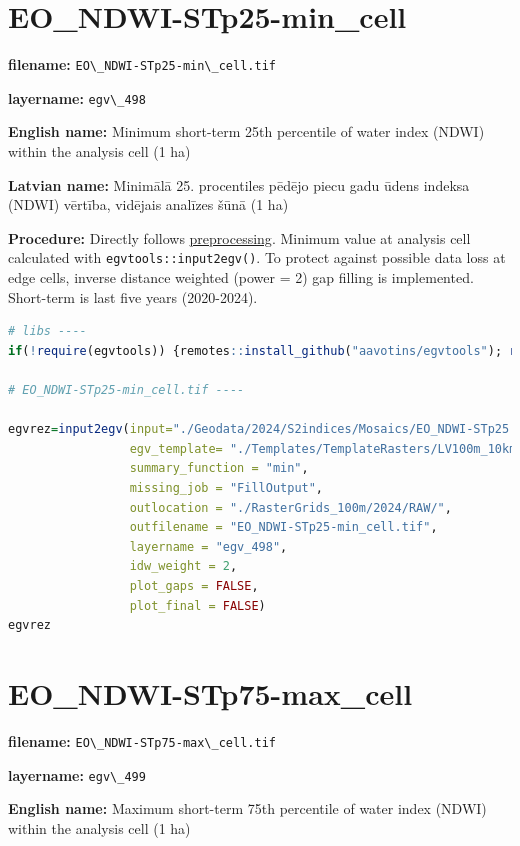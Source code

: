 \documentclass[
]{book}
\newcommand{\passthrough}[1]{#1}
\begin{document}
\section{EO\_NDWI-STp25-min\_cell}\label{ch06.498}

\textbf{filename:} \passthrough{\lstinline!EO\_NDWI-STp25-min\_cell.tif!}

\textbf{layername:} \passthrough{\lstinline!egv\_498!}

\textbf{English name:} Minimum short-term 25th percentile of water index (NDWI) within the analysis cell (1 ha)

\textbf{Latvian name:} Minimālā 25. procentiles pēdējo piecu gadu ūdens indeksa (NDWI) vērtība, vidējais analīzes šūnā (1 ha)

\textbf{Procedure:} Directly follows \hyperref[Ch04.13]{preprocessing}. Minimum value at analysis cell
calculated with \passthrough{\lstinline!egvtools::input2egv()!}. To protect against possible data loss at edge cells,
inverse distance weighted (power = 2) gap filling is implemented. Short-term is last five years (2020-2024).

\begin{lstlisting}[language=R]
# libs ----
if(!require(egvtools)) {remotes::install_github("aavotins/egvtools"); require(egvtools)}

# EO_NDWI-STp25-min_cell.tif ----

egvrez=input2egv(input="./Geodata/2024/S2indices/Mosaics/EO_NDWI-STp25.tif",
                 egv_template= "./Templates/TemplateRasters/LV100m_10km.tif",
                 summary_function = "min",
                 missing_job = "FillOutput",
                 outlocation = "./RasterGrids_100m/2024/RAW/",
                 outfilename = "EO_NDWI-STp25-min_cell.tif",
                 layername = "egv_498",
                 idw_weight = 2,
                 plot_gaps = FALSE,
                 plot_final = FALSE)
egvrez
\end{lstlisting}

\section{EO\_NDWI-STp75-max\_cell}\label{ch06.499}

\textbf{filename:} \passthrough{\lstinline!EO\_NDWI-STp75-max\_cell.tif!}

\textbf{layername:} \passthrough{\lstinline!egv\_499!}

\textbf{English name:} Maximum short-term 75th percentile of water index (NDWI) within the analysis cell (1 ha)
\end{document}

